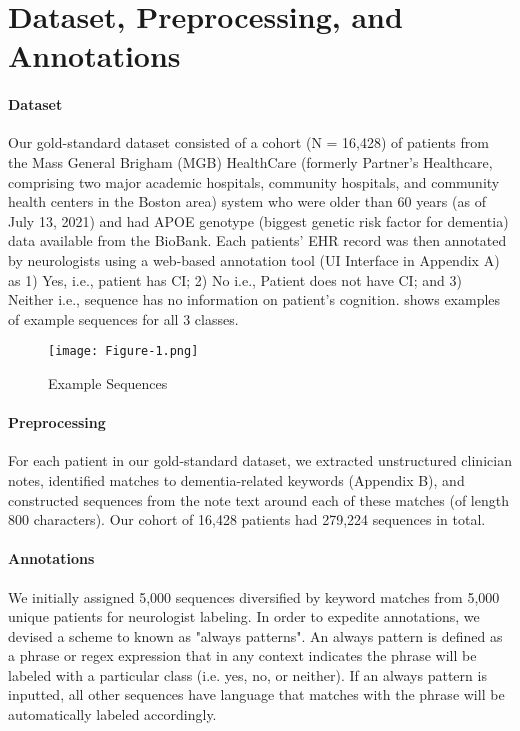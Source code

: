 \documentclass[pmlr,twocolumn,10pt]{jmlr} %
\begin{document}
\section{Dataset, Preprocessing, and Annotations}
\label{sec:Dataset+Preprocessing+Annotations}

\paragraph{Dataset}
\label{sec:Dataset} Our gold-standard dataset consisted of a cohort (N = 16,428) of patients from the Mass General Brigham (MGB) HealthCare (formerly Partner's Healthcare, comprising two major academic hospitals, community hospitals, and community health centers in the Boston area) system who were older than 60 years (as of July 13, 2021) and had APOE genotype (biggest genetic risk factor for dementia) data available from the BioBank. Each patients' EHR record was then annotated by neurologists using a web-based annotation tool (UI Interface in Appendix A) as 1) Yes, i.e., patient has CI; 2) No i.e., Patient does not have CI; and 3) Neither i.e., sequence has no information on patient’s cognition. 
 shows examples of example sequences for all 3 classes. 

\begin{figure*}[h!]
\label{fig:fig1}
\centering 
\texttt{[image: Figure-1.png]}
\caption{Example Sequences}
\end{figure*}

\paragraph{Preprocessing}
\label{sec:Preprocessing} For each patient in our gold-standard dataset, we extracted unstructured clinician notes, identified matches to dementia-related keywords (Appendix B), and constructed sequences from the note text around each of these matches (of length 800 characters). Our cohort of 16,428 patients had 279,224 sequences in total. 

\paragraph{Annotations}
\label{sec:Annotations} We initially assigned 5,000 sequences diversified by keyword matches from 5,000 unique patients for neurologist labeling. In order to expedite annotations, we devised a scheme to known as "always patterns". An always pattern is defined as a phrase or regex expression that in any context indicates the phrase will be labeled with a particular class (i.e. yes, no, or neither). If an always pattern is inputted, all other sequences have language that matches with the phrase will be automatically labeled accordingly.
\end{document}
